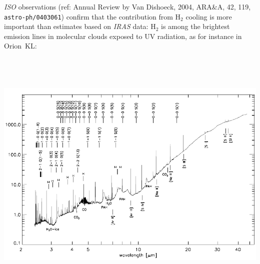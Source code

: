 



{\em ISO} observations (ref: Annual Review by Van Dishoeck, 2004,
ARA\&A, 42, 119, {\tt astro-ph/0403061}) confirm that the contribution
from H$_2$ cooling is more important than estimates based on {\em
IRAS} data: H$_2$ is among the brightest emission lines in molecular
clouds exposed to UV radiation, as for instance in Orion~KL:
\includegraphics[width=25cm,height=13cm]{./B/dishoeck_fig3.pdf}

\vfill

\foilhead{}

